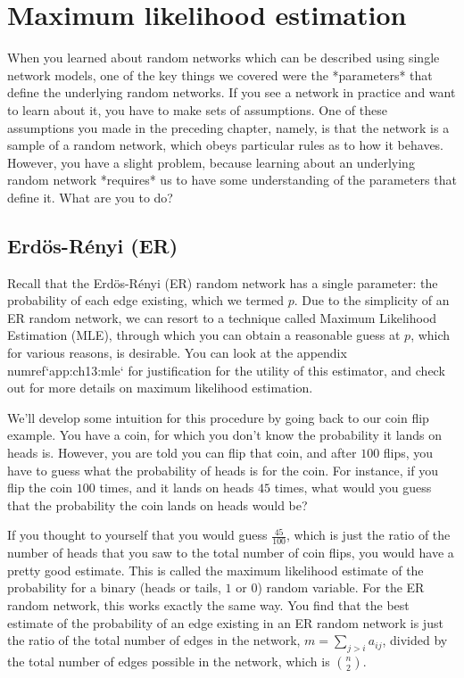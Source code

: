 \section{Maximum likelihood estimation}
\label{sec:ch6:mle}

When you learned about random networks which can be described using single network models, one of the key things we covered were the *parameters* that define the underlying random networks. If you see a network in practice and want to learn about it, you have to make sets of assumptions. One of these assumptions you made in the preceding chapter, namely, is that the network is a sample of a random network, which obeys particular rules as to how it behaves. However, you have a slight problem, because learning about an underlying random network *requires* us to have some understanding of the parameters that define it. What are you to do?


\subsection{Erd\"os-R\'enyi (ER)}

Recall that the Erd\"os-R\'enyi (ER) random network has a single parameter: the probability of each edge existing, which we termed $p$. Due to the simplicity of an ER random network, we can resort to a technique called Maximum Likelihood Estimation (MLE), through which you can obtain a reasonable guess at $p$, which for various reasons, is desirable. You can look at the appendix {numref}`app:ch13:mle` for justification for the utility of this estimator, and check out \cite{Casella2001Jun} for more details on maximum likelihood estimation.

We'll develop some intuition for this procedure by going back to our coin flip example. You have a coin, for which you don't know the probability it lands on heads is. However, you are told you can flip that coin, and after $100$ flips, you have to guess what the probability of heads is for the coin. For instance, if you flip the coin $100$ times, and it lands on heads $45$ times, what would you guess that the probability the coin lands on heads would be?

If you thought to yourself that you would guess $\frac{45}{100}$, which is just the ratio of the number of heads that you saw to the total number of coin flips, you would have a pretty good estimate. This is called the maximum likelihood estimate of the probability for a binary (heads or tails, $1$ or $0$) random variable. For the ER random network, this works exactly the same way. You find that the best estimate of the probability of an edge existing in an ER random network is just the ratio of the total number of edges in the network, $m = \sum_{j > i}a_{ij}$, divided by the total number of edges possible in the network, which is $\binom n 2$.

